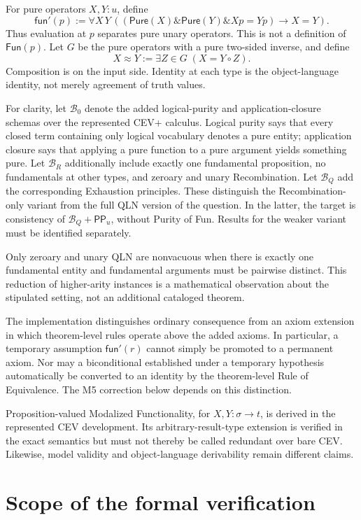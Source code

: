 \documentclass[12pt,leqno]{article}
\newcommand{\AND}{\ensuremath{\mathbin{\&}}}
\newcommand{\IC}{\ensuremath{\rightarrow}}
\newcommand{\Pure}{\mathsf{Pure}}
\newcommand{\Fun}{\mathsf{Fun}}
\newcommand{\funp}{\mathsf{fun}'}
\newcommand{\PP}{\mathsf{PP}}
\newcommand{\Bmin}{\mathcal B_0}
\newcommand{\BR}{\mathcal B_R}
\newcommand{\BQ}{\mathcal B_Q}
\begin{document}
For pure operators $X,Y:u$, define
\[
 \funp(p) := \forall X\,Y\,
 ((\Pure(X)\AND\Pure(Y)\AND Xp=Yp)\IC X=Y).
\]
Thus evaluation at $p$ separates pure unary operators. This is not a
definition of $\Fun(p)$. Let $G$ be the pure operators with a pure
two-sided inverse, and define
\[
 X\approx Y := \exists Z\in G\;(X=Y\circ Z).
\]
Composition is on the input side. Identity at each type is the
object-language identity, not merely agreement of truth values.

For clarity, let $\Bmin$ denote the added logical-purity and
application-closure schemas over the represented CEV+ calculus. Logical
purity says that every closed term containing only logical vocabulary
denotes a pure entity; application closure says that applying a pure
function to a pure argument yields something pure. Let $\BR$ additionally
include exactly one fundamental proposition, no fundamentals at other
types, and zeroary and unary Recombination. Let $\BQ$ add the corresponding
Exhaustion principles. These distinguish the Recombination-only variant
from the full QLN version of the question. In the latter, the target is
consistency of $\BQ+\PP_u$, without Purity of Fun. Results for the weaker
variant must be identified separately.

Only zeroary and unary QLN are nonvacuous when there is exactly one
fundamental entity and fundamental arguments must be pairwise distinct.
This reduction of higher-arity instances is a mathematical observation
about the stipulated setting, not an additional cataloged theorem.

The implementation distinguishes ordinary consequence from an axiom
extension in which theorem-level rules operate above the added axioms.
In particular, a temporary assumption $\funp(r)$ cannot simply be promoted
to a permanent axiom. Nor may a biconditional established under a
temporary hypothesis automatically be converted to an identity by the
theorem-level Rule of Equivalence. The M5 correction below depends on this
distinction.

Proposition-valued Modalized Functionality, for $X,Y:\sigma\to t$, is
derived in the represented CEV development. Its arbitrary-result-type
extension is verified in the exact semantics but must not thereby be
called redundant over bare CEV. Likewise, model validity and
object-language derivability remain different claims.

\section{Scope of the formal verification}
\end{document}
